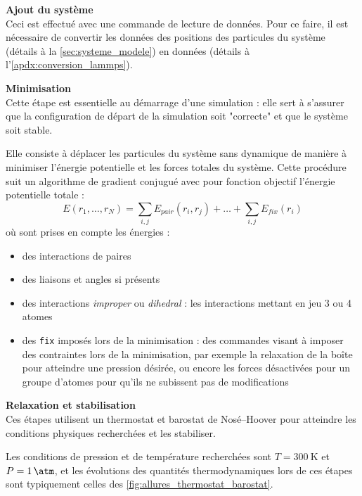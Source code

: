 \textbf{Ajout du système}\\
Ceci est effectué avec une commande \lammps{} de lecture de données. Pour ce faire, il est nécessaire de convertir les données des positions des particules du système (détails à la \autoref{sec:systeme_modele}) en données \lammps{} (détails à l'\autoref{apdx:conversion_lammps}).

\textbf{Minimisation}\\
Cette étape est essentielle au démarrage d'une simulation : elle sert à s'assurer que la configuration de départ de la simulation soit "correcte" et que le système soit stable.

Elle consiste à déplacer les particules du système sans dynamique de manière à minimiser l'énergie potentielle et les forces totales du système. Cette procédure suit un algorithme de gradient conjugué avec pour fonction objectif l'énergie potentielle totale :
\begin{equation*}
    E(r_1, \dots, r_N) = \sum_{i, j} E_{pair} (r_i, r_j) + \dots + \sum_{i, j} E_{fix} (r_i)
\end{equation*}
où sont prises en compte les énergies :
\begin{itemize}
    \item des interactions de paires
    \item des liaisons et angles si présents
    \item des interactions \textit{improper} ou \textit{dihedral} : les interactions mettant en jeu \num{3} ou \num{4} atomes
    \item des \lstinline!fix! imposés lors de la minimisation : des commandes \lammps{} visant à imposer des contraintes lors de la minimisation, par exemple la relaxation de la boîte pour atteindre une pression désirée, ou encore les forces désactivées pour un groupe d'atomes pour qu'ils ne subissent pas de modifications
\end{itemize}

\textbf{Relaxation et stabilisation}\\
Ces étapes utilisent un thermostat et barostat de Nosé--Hoover pour atteindre les conditions physiques recherchées et les stabiliser.

Les conditions de pression et de température recherchées sont $T = \qty{300}{\kelvin}$ et $P = \qty{1}{\atm}$, et les évolutions des quantités thermodynamiques lors de ces étapes sont typiquement celles des \autoref{fig:allures_thermostat_barostat}.

